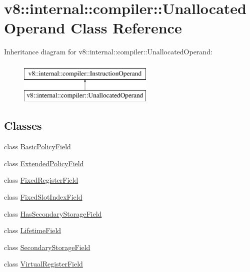 \hypertarget{classv8_1_1internal_1_1compiler_1_1UnallocatedOperand}{}\section{v8\+:\+:internal\+:\+:compiler\+:\+:Unallocated\+Operand Class Reference}
\label{classv8_1_1internal_1_1compiler_1_1UnallocatedOperand}
Inheritance diagram for v8\+:\+:internal\+:\+:compiler\+:\+:Unallocated\+Operand\+:\begin{figure}[H]
\begin{center}
\leavevmode
\includegraphics[height=2.000000cm]{classv8_1_1internal_1_1compiler_1_1UnallocatedOperand}
\end{center}
\end{figure}
\subsection*{Classes}
\begin{DoxyCompactItemize}
\item 
class \mbox{\hyperlink{classv8_1_1internal_1_1compiler_1_1UnallocatedOperand_1_1BasicPolicyField}{Basic\+Policy\+Field}}
\item 
class \mbox{\hyperlink{classv8_1_1internal_1_1compiler_1_1UnallocatedOperand_1_1ExtendedPolicyField}{Extended\+Policy\+Field}}
\item 
class \mbox{\hyperlink{classv8_1_1internal_1_1compiler_1_1UnallocatedOperand_1_1FixedRegisterField}{Fixed\+Register\+Field}}
\item 
class \mbox{\hyperlink{classv8_1_1internal_1_1compiler_1_1UnallocatedOperand_1_1FixedSlotIndexField}{Fixed\+Slot\+Index\+Field}}
\item 
class \mbox{\hyperlink{classv8_1_1internal_1_1compiler_1_1UnallocatedOperand_1_1HasSecondaryStorageField}{Has\+Secondary\+Storage\+Field}}
\item 
class \mbox{\hyperlink{classv8_1_1internal_1_1compiler_1_1UnallocatedOperand_1_1LifetimeField}{Lifetime\+Field}}
\item 
class \mbox{\hyperlink{classv8_1_1internal_1_1compiler_1_1UnallocatedOperand_1_1SecondaryStorageField}{Secondary\+Storage\+Field}}
\item 
class \mbox{\hyperlink{classv8_1_1internal_1_1compiler_1_1UnallocatedOperand_1_1VirtualRegisterField}{Virtual\+Register\+Field}}
\end{DoxyCompactItemize}
